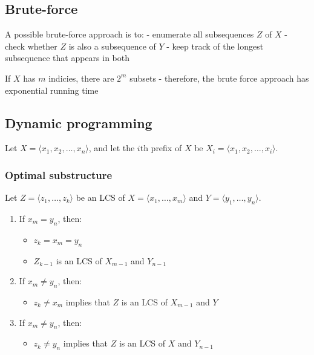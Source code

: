 \documentclass[11pt]{article}
\providecommand{\tightlist}{%
      \setlength{\itemsep}{0pt}\setlength{\parskip}{0pt}}
\begin{document}
    \subsection{Brute-force}\label{brute-force}

A possible brute-force approach is to: - enumerate all subsequences
\(Z\) of \(X\) - check whether \(Z\) is also a subsequence of \(Y\) -
keep track of the longest subsequence that appears in both

If \(X\) has \(m\) indicies, there are \(2^m\) subsets - therefore, the
brute force approach has exponential running time

    \subsection{Dynamic programming}\label{dynamic-programming}

Let \(X = \langle x_1, x_2, \dots, x_n \rangle\), and let the \(i\)th
prefix of \(X\) be \(X_i = \langle x_1, x_2, \dots, x_i \rangle\).

    \subsubsection{Optimal substructure}\label{optimal-substructure}

Let \(Z = \langle z_1, \dots, z_k \rangle\) be an LCS of
\(X = \langle x_1, \dots, x_m \rangle\) and
\(Y = \langle y_1, \dots, y_n \rangle\).

\begin{enumerate}
\def\labelenumi{\arabic{enumi}.}
\tightlist
\item
  If \(x_m = y_n\), then:

  \begin{itemize}
  \tightlist
  \item
    \(z_k = x_m = y_n\)
  \item
    \(Z_{k-1}\) is an LCS of \(X_{m-1}\) and \(Y_{n-1}\)
  \end{itemize}
\item
  If \(x_m \ne y_n\), then:

  \begin{itemize}
  \tightlist
  \item
    \(z_k \ne x_m\) implies that \(Z\) is an LCS of \(X_{m-1}\) and
    \(Y\)
  \end{itemize}
\item
  If \(x_m \ne y_n\), then:

  \begin{itemize}
  \tightlist
  \item
    \(z_k \ne y_n\) implies that \(Z\) is an LCS of \(X\) and
    \(Y_{n-1}\)
  \end{itemize}
\end{enumerate}
\end{document}
